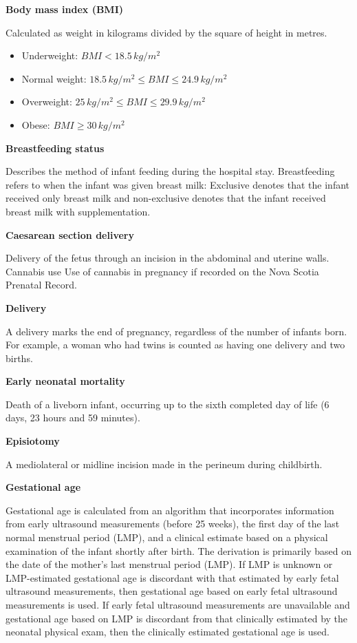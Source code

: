\documentclass[
]{krantz}
\providecommand{\tightlist}{%
  \setlength{\itemsep}{0pt}\setlength{\parskip}{0pt}}
\begin{document}
\textbf{Body mass index (BMI)}

Calculated as weight in kilograms divided by the square of height in metres.

\begin{itemize}
\tightlist
\item
  Underweight: \(BMI < 18.5 \, kg/m^{2}\)
\item
  Normal weight: \(18.5 \, kg/m^{2} \le BMI \le 24.9 \, kg/m^{2}\)
\item
  Overweight: \(25 \, kg/m^{2} \le BMI \le 29.9 \, kg/m^{2}\)
\item
  Obese: \(BMI \ge 30 \, kg/m^{2}\)
\end{itemize}

\textbf{Breastfeeding status}

Describes the method of infant feeding during the hospital stay. Breastfeeding refers to when the infant was given breast milk: Exclusive denotes that the infant received only breast milk and non-exclusive denotes that the infant received breast milk with supplementation.

\textbf{Caesarean section delivery}

Delivery of the fetus through an incision in the abdominal and uterine walls.
Cannabis use Use of cannabis in pregnancy if recorded on the Nova Scotia Prenatal Record.

\textbf{Delivery}

A delivery marks the end of pregnancy, regardless of the number of infants born. For example, a woman who had
twins is counted as having one delivery and two births.

\textbf{Early neonatal mortality}

Death of a liveborn infant, occurring up to the sixth completed day of life (6 days, 23 hours and 59 minutes).

\textbf{Episiotomy}

A mediolateral or midline incision made in the perineum during childbirth.

\textbf{Gestational age}

Gestational age is calculated from an algorithm that incorporates information from early ultrasound measurements (before 25 weeks), the first day of the last normal menstrual period (LMP), and a clinical estimate based on a physical examination of the infant shortly after birth. The derivation is primarily based on the date of the mother's last menstrual period (LMP). If LMP is unknown or LMP-estimated gestational age is discordant with that estimated by early fetal ultrasound measurements, then gestational age based on early fetal ultrasound measurements is used. If early fetal ultrasound measurements are unavailable and gestational age based on LMP is discordant from that clinically estimated by the neonatal physical exam, then the clinically estimated gestational age is used.
\end{document}
